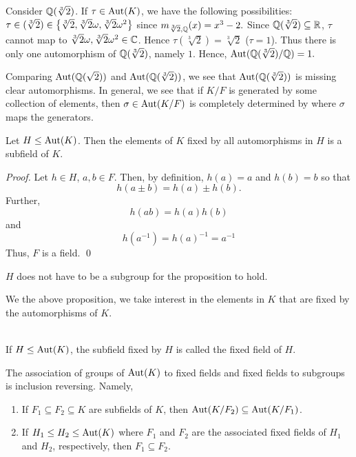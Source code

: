 \begin{example}
    Consider $\mathbb{Q}(\sqrt[3]{2})$. If $\tau \in \text{Aut}(K)$, we have the following possibilities: $\tau \in (\sqrt[3]{2}) \in \left\{\sqrt[3]{2}, \sqrt[3]{2}\omega, \sqrt[3]{2}\omega^2\right\}$ since $m_{\sqrt[3]{2}, \mathbb{Q}}(x) = x^3 -2.$ Since $\mathbb{Q}(\sqrt[3]{2}) \subseteq \mathbb{R}$, $\tau$ cannot map to  $\sqrt[3]{2}\omega, \sqrt[3]{2}\omega^2 \in \mathbb{C}$. Hence $\tau(\sqrt[3]{2}) = \sqrt[3]{2}$ ($\tau = 1$). Thus there is only one automorphism of $\mathbb{Q}(\sqrt[3]{2})$, namely $1$. Hence, $\text{Aut}(\mathbb{Q}(\sqrt[3]{2}) / \mathbb{Q}) = 1.$
\end{example}
Comparing $\text{Aut}(\mathbb{Q}(\sqrt{2}))$ and $\text{Aut}(\mathbb{Q}(\sqrt[3]{2}))$, we see that $\text{Aut}(\mathbb{Q}(\sqrt[3]{2}))$ is missing clear automorphisms. In general, we see that if $K/F$ is generated by some collection of elements, then $\sigma \in \text{Aut}(K/F)$ is completely determined by where $\sigma$ maps the generators.

\begin{proposition}
    Let $H \leq \text{Aut}(K)$. Then the elements of $K$ fixed by all automorphisms in $H$ is a subfield of $K$.
\end{proposition}

\begin{proof}
    Let $h \in H$, $a,b\in F$. Then, by definition, $h(a) = a$ and $h(b) = b$ so that 
    $$h(a\pm b) = h(a) \pm h(b).$$
    Further,
    $$h(ab) = h(a)h(b)$$
    and
    $$h(a^{-1}) = h(a)^{-1} = a^{-1}$$
    Thus, $F$ is a field.
    \qed
\end{proof}

\begin{note}
    $H$ does not have to be a subgroup for the proposition to hold.
\end{note}

We the above proposition, we take interest in the elements in $K$ that are fixed by the automorphisms of $K$.

\begin{definition} \leavevmode \\
    If $H \leq \text{Aut}(K)$, the subfield fixed by $H$ is called the fixed field of $H$.
\end{definition}

\begin{proposition}
    The association of groups of $\text{Aut}(K)$ to fixed fields and fixed fields to subgroups is inclusion reversing. Namely,
    \begin{enumerate}
        \item If $F_1 \subseteq F_2 \subseteq K$ are subfields of $K$, then $\text{Aut}(K/F_2) \subseteq \text{Aut}(K /F_1)$.
        \item If $H_1 \leq H_2 \leq \text{Aut}(K)$ where $F_1$ and $F_2$ are the associated fixed fields of $H_1$ and $H_2$, respectively, then $F_1 \subseteq F_2$.
    \end{enumerate}
\end{proposition}

